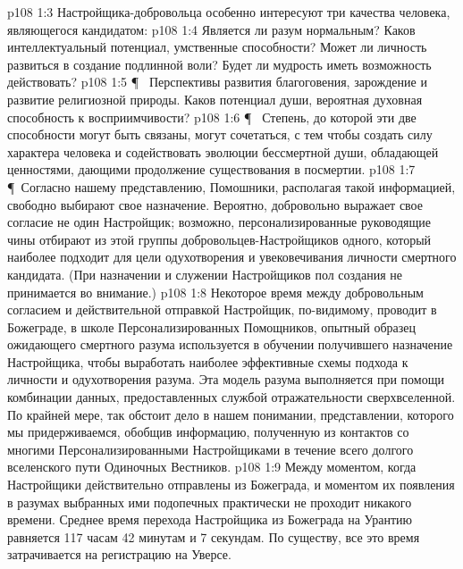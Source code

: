 \vs p108 1:3 Настройщика\hyp{}добровольца особенно интересуют три качества человека, являющегося кандидатом:
\vs p108 1:4 \bibnobreakspace {} Является ли разум нормальным? Каков интеллектуальный потенциал, умственные способности? Может ли личность развиться в создание подлинной воли? Будет ли мудрость иметь возможность действовать?
\vs p108 1:5 \P\ \bibnobreakspace {} Перспективы развития благоговения, зарождение и развитие религиозной природы. Каков потенциал души, вероятная духовная способность к восприимчивости?
\vs p108 1:6 \P\ \bibnobreakspace {} Степень, до которой эти две способности могут быть связаны, могут сочетаться, с тем чтобы создать силу характера человека и содействовать эволюции бессмертной души, обладающей ценностями, дающими продолжение существования в посмертии.
\vs p108 1:7 \P\ Согласно нашему представлению, Помошники, располагая такой информацией, свободно выбирают свое назначение. Вероятно, добровольно выражает свое согласие не один Настройщик; возможно, персонализированные руководящие чины отбирают из этой группы добровольцев\hyp{}Настройщиков одного, который наиболее подходит для цели одухотворения и увековечивания личности смертного кандидата. (При назначении и служении Настройщиков пол создания не принимается во внимание.)
\vs p108 1:8 Некоторое время между добровольным согласием и действительной отправкой Настройщик, по\hyp{}видимому, проводит в Божеграде, в школе Персонализированных Помощников, опытный образец ожидающего смертного разума используется в обучении получившего назначение Настройщика, чтобы выработать наиболее эффективные схемы подхода к личности и одухотворения разума. Эта модель разума выполняется при помощи комбинации данных, предоставленных службой отражательности сверхвселенной. По крайней мере, так обстоит дело в нашем понимании, представлении, которого мы придерживаемся, обобщив информацию, полученную из контактов со многими Персонализированными Настройщиками в течение всего долгого вселенского пути Одиночных Вестников.
\vs p108 1:9 Между моментом, когда Настройщики действительно отправлены из Божеграда, и моментом их появления в разумах выбранных ими подопечных практически не проходит никакого времени. Среднее время перехода Настройщика из Божеграда на Урантию равняется 117 часам 42 минутам и 7 секундам. По существу, все это время затрачивается на регистрацию на Уверсе.
